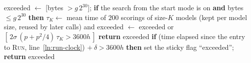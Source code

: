 \begin{algorithm}
{\begin{algorithmic}[1]
\State exceeded $\gets$ [bytes $>g\,2^{30}$]; \textbf{if} the search from the start mode is on \textbf{and} bytes $\le g\,2^{30}$ \textbf{then} $\tau_K\gets$ mean time of $200$ scorings of size-$K$ models (kept per model size, reused by later calls) and exceeded $\gets$ exceeded or $[\,2\sigma\,(p+p^2/4)\,\tau_K>3600h\,]$ %
\State \textbf{return} exceeded %
\EndIf
\EndProcedure
{}
\State \textbf{if} (time elapsed since the entry to \textsc{Run}, line~\ref{ln:run-clock}) $+\ \delta>3600h$ \textbf{then} set the sticky flag ``exceeded''; \textbf{return} exceeded %
\EndProcedure
\end{algorithmic}}
\end{algorithm}


